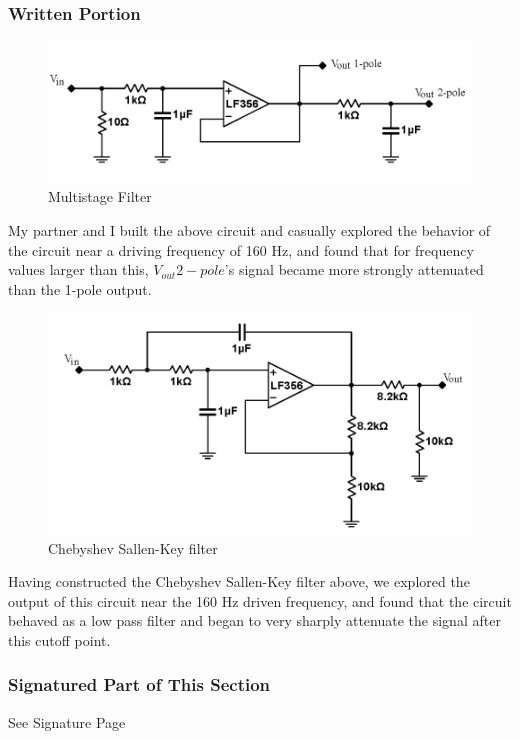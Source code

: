 \documentclass{article}
\begin{document}
        \subsubsection{Written Portion}
        \begin{figure}[H]
            \centering
            \includegraphics[scale = 0.6]{41.png}
            \caption{Multistage Filter \cite{lab7}}
            \label{fig:my_label}
        \end{figure}
        My partner and I built the above circuit and casually explored the behavior of the circuit near a driving frequency of 160 Hz, and found that for frequency values larger than this, $V_{out} 2-pole$'s signal became more strongly attenuated than the 1-pole output.
        \begin{figure}[H]
            \centering
            \includegraphics[scale = 0.6]{42.png}
            \caption{Chebyshev Sallen-Key filter \cite{lab7}}
            \label{fig:my_label}
        \end{figure}
        Having constructed the Chebyshev Sallen-Key filter above, we explored the output of this circuit near the 160 Hz driven frequency, and found that the circuit behaved as a low pass filter and began to very sharply attenuate the signal after this cutoff point.
        \subsubsection{Signatured Part of This Section}
        See Signature Page
\end{document}
